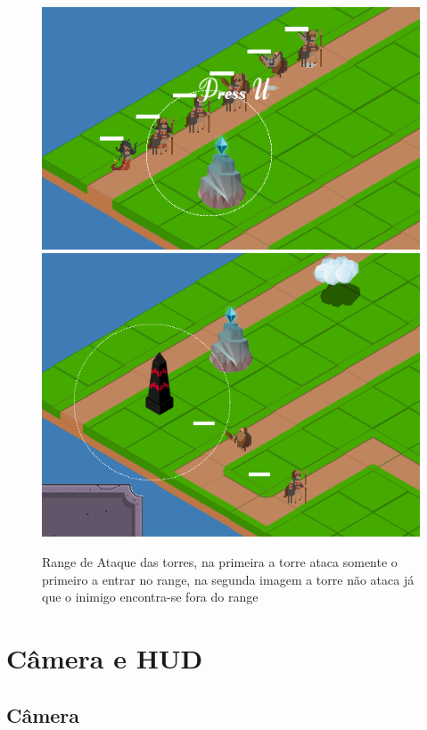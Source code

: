 \documentclass[11pt]{article} %
\begin{document}
\begin{figure}[!htp]
\centering
\includegraphics[scale=0.35]{res/atac.png} \quad
\includegraphics[scale=0.3]{res/dont.png}
\caption{Range de Ataque das torres, na primeira a torre ataca somente o primeiro a entrar no range, na segunda imagem a torre não ataca já que o inimigo encontra-se fora do range}
\label{Tela Barracks}
\end{figure}

\newpage

\section{Câmera e HUD}

\subsection{Câmera}
\end{document}
